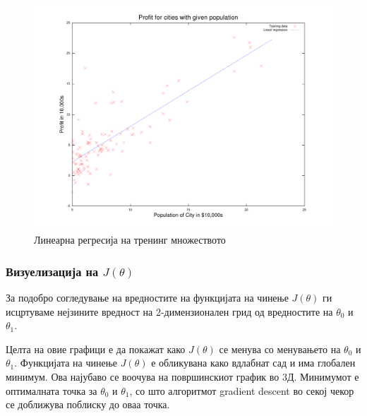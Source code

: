 \documentclass[12pt,a4paper]{article}
\begin{document}
\begin{figure}[htb]
\centering
\includegraphics[width=.9\textwidth]{src/line_fit}
\caption{Линеарна регресија на тренинг множеството}
\label{fig:linear_fit}
\end{figure}

\subsubsection{Визуелизација на $J(\theta)$}
За подобро согледување на вредностите на функцијата на чинење $J(\theta)$ ги
исцртуваме нејзините вредност на 2-димензионален грид од вредностите
на $\theta_0$ и $\theta_1$.

Целта на овие графици е да покажат како $J(\theta)$ се менува со менувањето на
$\theta_0$ и $\theta_1$. Функцијата на чинење $J(\theta)$ е обликувана како
вдлабнат сад и има глобален минимум. Ова најубаво се воочува на површинскиот
график во 3Д. Минимумот е оптималната точка за $\theta_0$ и $\theta_1$, со што
алгоритмот gradient descent во секој чекор се доближува поблиску до оваа точка.
\end{document}
